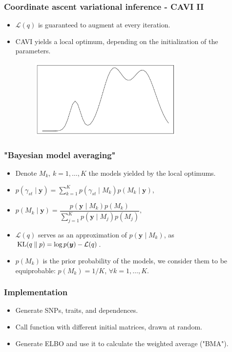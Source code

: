 \documentclass{beamer}
\DeclareMathOperator*{\KL}{{\rm KL}}
\begin{document}
\begin{frame}
\frametitle{Coordinate ascent variational inference - CAVI II}
\begin{itemize}
\item $\mathcal{L}(q)$ is guaranteed to augment at every iteration.
\item CAVI yields a local optimum, depending on the initialization of the parameters.
\begin{figure}
\includegraphics[width=3in]{images/localOptimum.png}
\end{figure}
\end{itemize}
\end{frame}

\begin{frame}
\frametitle{"Bayesian model averaging"}
\begin{itemize}
\item Denote $M_k$, $k= 1,\ldots, K$ the models yielded by the local optimums.
\item $p(\gamma_{st} \mid \boldsymbol{y}) = \sum_{k=1}^{K}p(\gamma_{st}\mid M_k)p(M_k \mid \boldsymbol{y})$,
\item $p(M_k \mid \boldsymbol{y}) = \dfrac{p(\boldsymbol{y} \mid M_k)p(M_k)}{\sum_{j=1}^{K}p(\boldsymbol{y}\mid M_j)p(M_j)},$
\item $\mathcal{L}(q)$ serves as an approximation of $p(\boldsymbol{y} \mid M_k)$, as $\KL(q\parallel p) = \log p(\boldsymbol{y}) - \mathcal{L}(q)$.
\item $p(M_k)$ is the prior probability of the models, we consider them to be equiprobable: $p(M_k) = 1/K$, $\forall k = 1,\ldots,K$.
\end{itemize}
\end{frame}

\begin{frame}
\frametitle{Implementation}
\begin{itemize}
\item Generate SNPs, traits, and dependences.
\item Call function with different initial matrices, drawn at random.
\item Generate ELBO and use it to calculate the weighted average ("BMA").
\end{itemize}
\end{frame}
\end{document}
